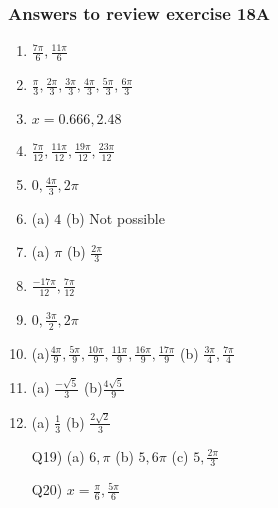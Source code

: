\documentclass{article}
\begin{document}
\begin{figure}
  \centering
  \caption{}
\end{figure}

\subsubsection {Answers to review exercise 18A}

\begin{enumerate}[label=Q\arabic*)]
  \item $\frac{7\pi}{6}, \frac{11\pi}{6}$
  \item $\frac{\pi}{3}, \frac{2\pi}{3}, \frac{3\pi}{3}, \frac{4\pi}{3}, \frac{5\pi}{3}, \frac{6\pi}{3}$
  \item $x = 0.666, 2.48$
  \item $\frac{7\pi}{12}, \frac{11\pi}{12}, \frac{19\pi}{12}, \frac{23\pi}{12}$
  \item $0, \frac{4\pi}{3}, 2\pi$
  \item (a) $4$ (b) Not possible
  \item (a) $\pi$ (b) $\frac{2\pi}{3}$
  \item $\frac{-17\pi}{12}, \frac{7\pi}{12}$
  \item $0, \frac{3\pi}{2}, 2\pi$
  \item (a)$\frac{4\pi}{9}, \frac{5\pi}{9}, \frac{10\pi}{9}, \frac{11\pi}{9}, \frac{16\pi}{9}, \frac{17\pi}{9}$ (b) $\frac{3\pi}{4}, \frac{7\pi}{4}$
  \item (a) $\frac{-\sqrt{5}}{3}$ (b)$\frac{4\sqrt{5}}{9}$
  \item (a) $\frac{1}{3}$ (b) $\frac{2\sqrt{2}}{3}$
  \item[Q19)] (a) $6, \pi$ (b) $5, 6\pi$ (c) $5, \frac{2\pi}{3}$
  \item[Q20)] $x = \frac{\pi}{6}, \frac{5\pi}{6}$
\end{enumerate}
\end{document}
